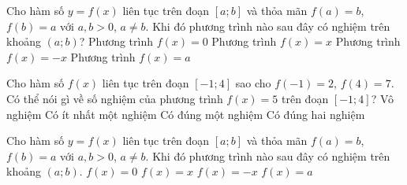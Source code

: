 \begin{ex}%
	Cho hàm số $y = f(x)$ liên tục trên đoạn $\left[a; b\right]$ và thỏa mãn $f(a) = b$, $f(b) = a$ với $a, b >  0$, $a \neq b$. Khi đó phương trình nào sau đây có nghiệm trên khoảng $\left(a; b\right)$?
	 \choice
		{Phương trình $f(x) = 0$} 
		 {\True Phương trình $f(x) = x$}
		{Phương trình $f(x)  = -x$}
		{Phương trình $f(x)  = a$}
\end{ex}

\begin{ex}%
	Cho hàm số $f(x)$ liên tục trên đoạn $[-1;4]$ sao cho $f(-1)=2$, $f(4)=7$. Có  thể nói gì về số nghiệm của phương trình $f(x)=5$ trên đoạn $[-1;4]$?
	 \choice
		{Vô  nghiệm}
		{\True Có ít nhất một  nghiệm}
		{Có đúng một nghiệm} 
		{Có đúng hai  nghiệm}
\end{ex}

\begin{ex}%
	Cho hàm số $y=f(x)$ liên tục trên đoạn $\left[a;b\right]$ và thỏa mãn $f(a)=b$, $f(b)=a$ với $a,b > 0$, $a\ne b$. Khi đó phương trình nào sau đây có nghiệm  trên khoảng $\left(a;b\right)$.
	 \choice
		{$f(x)=0$} 
		{\True  $f(x)=x$}
		{$f(x)=-x$} 
		 {$f(x)=a$}
\end{ex}

